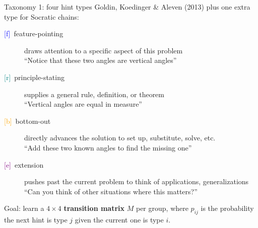 \documentclass[10pt,aspectratio=169]{beamer}
\newcommand{\hf}{\textcolor{blue}{[f]}}
\newcommand{\hr}{\textcolor{teal}{[r]}}
\newcommand{\hb}{\textcolor{orange}{[b]}}
\newcommand{\he}{\textcolor{purple}{[e]}}
\begin{document}
\begin{frame}{Taxonomy 1: four hint types}
  Goldin, Koedinger \& Aleven (2013) plus one extra type for Socratic chains:
  \medskip
  \begin{description}
    \item[\hf~feature-pointing] draws attention to a specific aspect of this problem \\ {\small ``Notice that these two angles are vertical angles''}  
    \item[\hr~principle-stating] supplies a general rule, definition, or theorem \\ 
          {\small ``Vertical angles are equal in measure''}  
    \item[\hb~bottom-out] directly advances the solution to set up, substitute, solve, etc. \\
          {\small ``Add these two known angles to find the missing one''}  
    \item[\he~extension] pushes past the current problem to think of applications, generalizations \\
          {\small ``Can you think of other situations where this matters?''}  
  \end{description}
  \medskip
   
    Goal: learn a $4\times4$ \textbf{transition matrix} $M$ per group, where $p_{ij}$ is the probability the next hint is type $j$ given the current one is type $i$.

\end{frame}
\end{document}
